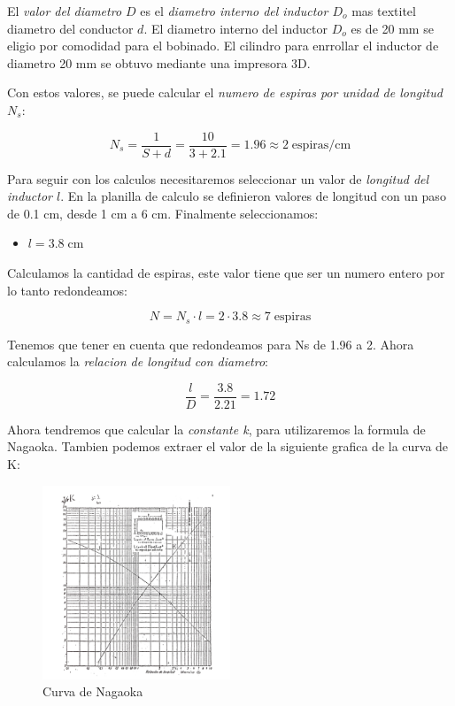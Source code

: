El  \textit{valor del diametro $D$} es el \textit{ diametro interno del inductor $D_o$} mas textit{el diametro del conductor $d$}. El diametro interno del inductor $D_o$ es de 20 mm se eligio por comodidad para el bobinado.
El cilindro para enrrollar el inductor de diametro 20 mm se obtuvo mediante una impresora 3D.


Con estos valores, se puede calcular el \textit{numero de espiras por unidad de longitud $N_s$}:

\begin{equation}
    N_s = \frac{1}{S + d} = \frac{10}{3 + 2.1 } = 1.96 \approx 2 \; \text{espiras/cm}
\end{equation}

Para seguir con los calculos necesitaremos seleccionar un valor de \textit{longitud del inductor $l$}. En la planilla de calculo se definieron valores de longitud con un paso de 0.1 cm, desde 1 cm a 6 cm.
Finalmente seleccionamos:

\begin{itemize}
    \item $l = 3.8\; \text{cm}$
\end{itemize}

Calculamos la cantidad de espiras, este valor tiene que ser un numero entero por lo tanto redondeamos:

\begin{equation}
    N = N_s \cdot l = 2 \cdot 3.8 \approx 7\; \text{espiras} 
\end{equation}

Tenemos que tener en cuenta que redondeamos para Ns de 1.96 a 2. Ahora calculamos la \textit{relacion de longitud con diametro}:

\begin{equation}
    \frac{l}{D} = \frac{3.8}{2.21} = 1.72
\end{equation}

Ahora tendremos que calcular la \textit{constante k}, para utilizaremos la formula de Nagaoka. Tambien podemos extraer el valor de la siguiente grafica de la curva de K:

\begin{figure}
    \centering
    \includegraphics[width=0.5\textwidth]{Imagenes/curva.png}
    \caption{Curva de Nagaoka}
\end{figure}

